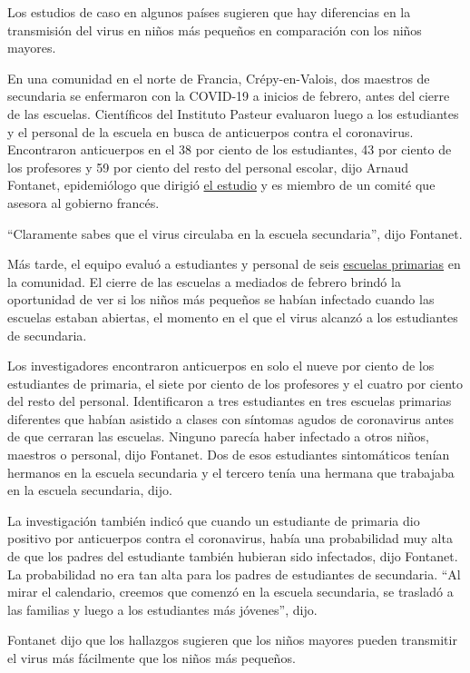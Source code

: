 Los estudios de caso en algunos países sugieren que hay diferencias en
la transmisión del virus en niños más pequeños en comparación con los
niños mayores.

En una comunidad en el norte de Francia, Crépy-en-Valois, dos maestros
de secundaria se enfermaron con la COVID-19 a inicios de febrero, antes
del cierre de las escuelas. Científicos del Instituto Pasteur evaluaron
luego a los estudiantes y el personal de la escuela en busca de
anticuerpos contra el coronavirus. Encontraron anticuerpos en el 38 por
ciento de los estudiantes, 43 por ciento de los profesores y 59 por
ciento del resto del personal escolar, dijo Arnaud Fontanet,
epidemiólogo que dirigió
\href{https://www.medrxiv.org/content/10.1101/2020.04.18.20071134v1}{el
estudio} y es miembro de un comité que asesora al gobierno francés.

``Claramente sabes que el virus circulaba en la escuela secundaria'',
dijo Fontanet.

Más tarde, el equipo evaluó a estudiantes y personal de seis
\href{https://www.medrxiv.org/content/10.1101/2020.06.25.20140178v2}{escuelas
primarias} en la comunidad. El cierre de las escuelas a mediados de
febrero brindó la oportunidad de ver si los niños más pequeños se habían
infectado cuando las escuelas estaban abiertas, el momento en el que el
virus alcanzó a los estudiantes de secundaria.

Los investigadores encontraron anticuerpos en solo el nueve por ciento
de los estudiantes de primaria, el siete por ciento de los profesores y
el cuatro por ciento del resto del personal. Identificaron a tres
estudiantes en tres escuelas primarias diferentes que habían asistido a
clases con síntomas agudos de coronavirus antes de que cerraran las
escuelas. Ninguno parecía haber infectado a otros niños, maestros o
personal, dijo Fontanet. Dos de esos estudiantes sintomáticos tenían
hermanos en la escuela secundaria y el tercero tenía una hermana que
trabajaba en la escuela secundaria, dijo.

La investigación también indicó que cuando un estudiante de primaria dio
positivo por anticuerpos contra el coronavirus, había una probabilidad
muy alta de que los padres del estudiante también hubieran sido
infectados, dijo Fontanet. La probabilidad no era tan alta para los
padres de estudiantes de secundaria. ``Al mirar el calendario, creemos
que comenzó en la escuela secundaria, se trasladó a las familias y luego
a los estudiantes más jóvenes'', dijo.

Fontanet dijo que los hallazgos sugieren que los niños mayores pueden
transmitir el virus más fácilmente que los niños más pequeños.

